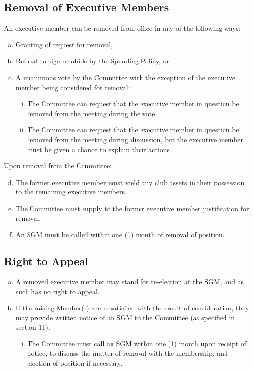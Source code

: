 \documentclass[a4paper,12pt]{article}
\begin{document}
\subsection{Removal of Executive Members}

An executive member can be removed from office in any of the following ways:

\begin{enumerate}[a)]
	\item Granting of request for removal,
	\item Refusal to sign or abide by the Spending Policy, or
	\item A unanimous vote by the Committee with the exception of the executive member being considered for removal:
	\begin{enumerate}[i)]
		\item The Committee can request that the executive member in question be removed from the meeting during the vote.
		\item The Committee can request that the executive member in question be removed from the meeting during discussion, but the executive member must be given a chance to explain their actions.
	\end{enumerate}
\end{enumerate}

Upon removal from the Committee:

\begin{enumerate}[a)]
	\setcounter{enumi}{3}
	\item The former executive member must yield any club assets in their possession to the remaining executive members.
	\item The Committee must supply to the former executive member justification for removal.
	\item An SGM must be called within one (1) month of removal of position.
\end{enumerate}

\subsection{Right to Appeal}

\begin{enumerate}[a)]
	\item A removed executive member may stand for re-election at the SGM, and as such has no right to appeal.
	\item If the raising Member(s) are unsatisfied with the result of consideration, they may provide written notice of an SGM to the Committee (as specified in section 11).
	\begin{enumerate}[i)]
		\item The Committee must call an SGM within one (1) month upon receipt of notice, to discuss the matter of removal with the membership, and election of position if necessary.
	\end{enumerate}
\end{enumerate}
\end{document}
